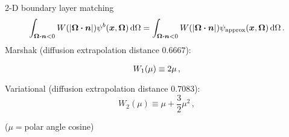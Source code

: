 \documentclass{beamer}
\begin{document}
%
%  

\begin{frame}{2-D boundary layer matching}
\begin{equation*}
\int_{\bm{\Omega}\bm{\cdot}\bm{n} < 0} W( \left| \bm{\Omega}\bm{\cdot}\bm{n} \right|)
\psi^b(\bm{x}, \bm{\Omega}) \mathop{}\!\mathrm{d}\Omega
=
\int_{\bm{\Omega}\bm{\cdot}\bm{n} < 0} W( \left| \bm{\Omega}\bm{\cdot}\bm{n} \right|)
\psi_\text{approx}(\bm{x}, \bm{\Omega}) \mathop{}\!\mathrm{d}\Omega \,.
\end{equation*}
Marshak (diffusion extrapolation distance $0.6667$):
\begin{equation*}
  W_1(\mu) \equiv \vphantom{\frac12} 2 \mu \,,
\end{equation*}
Variational (diffusion extrapolation distance $0.7083$):
\begin{equation*}
   W_2(\mu) \equiv \mu + \frac{3}{2} \mu^2 \,,
\end{equation*}

($\mu={}$polar angle cosine)
\end{frame}
\end{document}
